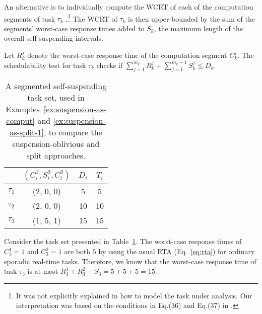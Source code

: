 
\label{sec:model-interferred:split}

An alternative is to individually compute the WCRT of each of the computation segments of task $\tau_k$ \cite{bletsas:thesis,PH:rtss98,Huang:multiseg}.\footnote{\label{footnote-rtss98}It was not explicitly explained in \cite{PH:rtss98} how to model the task under analysis. Our interpretation was based on the conditions in Eq.(36) and Eq.(37) in \cite{PH:rtss98}.}
The WCRT of $\tau_k$ is then upper-bounded by the sum of the segments' worst-case response times added to $S_k$, the maximum length of the overall
self-suspending intervals. 
 
Let $R_k^j$ denote the worst-case response time of the computation segment $C_k^j$. The schedulability test for task $\tau_k$ checks if $\sum_{j=1}^{m_k} R_k^j + \sum_{j=1}^{m_k-1} S_k^j \leq D_k $. 

\begin{table}[t]
\centering
    \begin{tabular}{|c|c|c|c|}
 \hline
        & $(C_i^1, S_i^2, C_i^2)$ &  $D_i$ & $T_i$\\ 
        \hline
        $\tau_1$ & (2, 0, 0) &  5 & 5\\ 
        $\tau_2$ &  (2, 0, 0) & 10 & 10 \\ 
        $\tau_3$ & (1, 5, 1) & 15  & 15\\
        \hline
    \end{tabular} 
    \caption{A segmented self-suspending task set, used in Examples~\ref{ex:suspension-as-comput} and \ref{ex:suspension-as-split-1}, to compare the suspension-oblivious and split approaches.}
    \label{table:static-example}
\end{table}

\begin{example}
\label{ex:suspension-as-split-1}   
Consider the task set presented in Table~\ref{table:static-example}. The worst-case response times of $C_3^1=1$ and $C_3^2=1$ are both $5$ by using the usual RTA (Eq.~\eqref{eq:rta}) for ordinary sporadic real-time tasks. Therefore, we know that the worst-case response time of task $\tau_3$ is at most $R_3^1 + R_3^2 + S_3 = 5 + 5 + 5 = 15$.
\hfill\myendproof  
\end{example}

